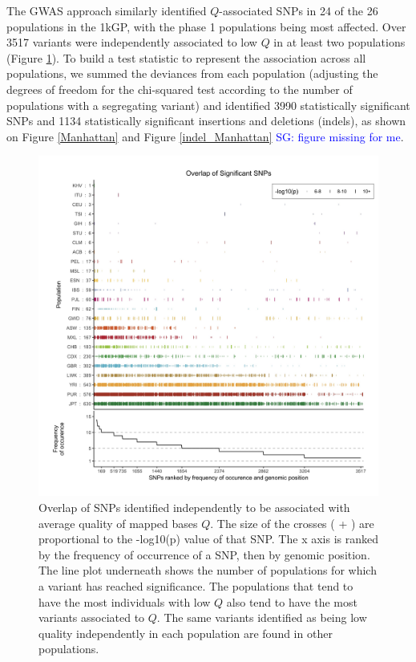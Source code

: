 \documentclass[9pt,lineno]{elife}
\newcommand{\sgcomment}[1]{\textcolor{blue}{SG: #1}}
\begin{document}
The GWAS approach similarly identified $Q$-associated SNPs in 24 of the 26 populations in the 1kGP, with the phase 1 populations being most affected.
Over 3517 variants were independently associated to low $Q$ in at least two populations  (Figure \ref{OverLap}). To build a test statistic to represent the association across all populations, we summed the deviances from each population (adjusting the degrees of freedom for the chi-squared test according to the number of populations with a segregating variant) and identified 3990 statistically significant SNPs and 1134 statistically significant insertions and deletions (indels), as shown on Figure \ref{Manhattan} and Figure \ref{indel_Manhattan} \sgcomment{figure missing for me}.


\begin{figure}
\includegraphics[width=\hsize,keepaspectratio]{./Figures/SNPOverlap6.jpg}

\caption{Overlap of SNPs identified independently to be associated with average quality of mapped bases $Q$. 
The size of the crosses ( + ) are proportional to the -log10(p) value of that SNP.
The x axis is ranked by the frequency of occurrence of a SNP, then by genomic position.
The line plot underneath shows the number of populations for which a variant has reached significance.
The populations that tend to have the most individuals with low $Q$ also tend to have the most variants associated to $Q$. 
The same variants identified as being low quality independently in each population are found in other populations. }
  \label{OverLap}
\end{figure}
\end{document}
